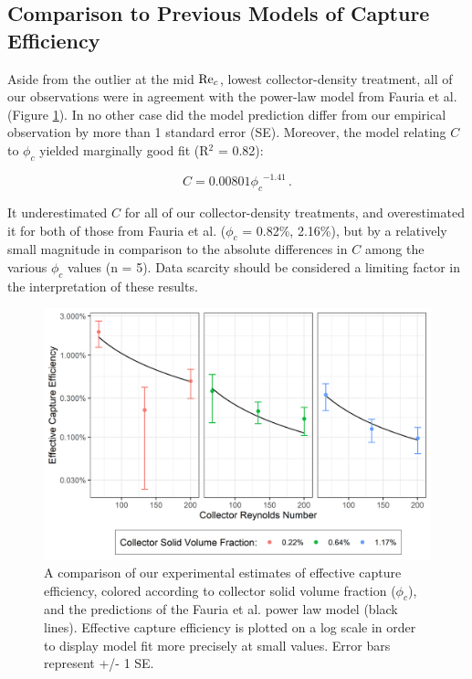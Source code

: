 \documentclass[geosciences,article,submit,moreauthors,pdftex]{Definitions/mdpi}
\begin{document}
\subsection{Comparison to Previous Models of Capture Efficiency}

Aside from the outlier at the mid $\mathrm{Re}_c$, lowest collector-density treatment, all of our observations were in agreement with the power-law model from Fauria et al. \cite{Fauria_2015} (Figure \ref{fig:compplot}). In no other case did the model prediction differ from our empirical observation by more than 1 standard error (SE). Moreover, the model relating $C$ to $\phi_c$ yielded marginally good fit (R$^2$ = 0.82):

\begin{equation}
    C = 0.00801{\phi_c}^{-1.41}\,.
\end{equation}

\noindent It underestimated $C$ for all of our collector-density treatments, and overestimated it for both of those from Fauria et al. ($\phi_c$ = 0.82\%, 2.16\%), but by a relatively small magnitude in comparison to the absolute differences in $C$ among the various $\phi_c$ values (n = 5). Data scarcity should be considered a limiting factor in the interpretation of these results.

\begin{figure}[H]
\centering
\includegraphics[width=5in]{../pics/comparisonplot.png}
\caption{A comparison of our experimental estimates of effective capture efficiency, colored according to collector solid volume fraction ($\phi_c$), and the predictions of the Fauria et al. \cite{Fauria_2015} power law model (black lines). Effective capture efficiency is plotted on a log scale in order to display model fit more precisely at small values. Error bars represent +/- 1 SE.}
\label{fig:compplot}
\end{figure}   
\end{document}
